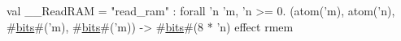 val __ReadRAM = "read_ram" : forall 'n 'm, 'n >= 0.
  (atom('m), atom('n), #\hyperref[zbits]{bits}#('m), #\hyperref[zbits]{bits}#('m)) -> #\hyperref[zbits]{bits}#(8 * 'n) effect {rmem}
